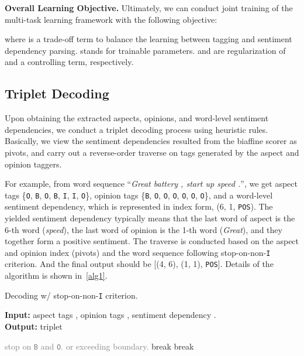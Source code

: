 \documentclass[11pt,a4paper]{article}
\begin{document}
\noindent \textbf{Overall Learning Objective.} Ultimately, we can conduct joint training of the multi-task learning framework with the following objective:

where  is a trade-off term to balance the learning between tagging and sentiment dependency parsing.  stands for trainable parameters.  and  are  regularization of  and a controlling term, respectively.

\subsection{Triplet Decoding}

Upon obtaining the extracted aspects, opinions, and word-level sentiment dependencies, we conduct a triplet decoding process using heuristic rules. Basically, we view the sentiment dependencies resulted from the biaffine scorer as pivots, and carry out a reverse-order traverse on tags generated by the aspect and opinion taggers. 

For example, from word sequence ``\textit{Great battery , start up speed .}'', we get aspect tags \{\texttt{O}, \texttt{B}, \texttt{O}, \texttt{B}, \texttt{I}, \texttt{I}, \texttt{O}\}, opinion tags \{\texttt{B}, \texttt{O}, \texttt{O}, \texttt{O}, \texttt{O}, \texttt{O}, \texttt{O}\}, and a word-level sentiment dependency, which is represented in index form, (6, 1, \texttt{POS}). The yielded sentiment dependency typically means that the last word of aspect is the 6-th word (\textit{speed}), the last word of opinion is the 1-th word (\textit{Great}), and they together form a positive sentiment. The traverse is conducted based on the aspect and opinion index (pivots) and the word sequence following stop-on-non-\texttt{I} criterion. And the final output should be [(4, 6), (1, 1), \texttt{POS}]. Details of the algorithm is shown in~\ref{alg1}.

\begin{algorithm}
    \caption{Decoding w/ stop-on-non-\texttt{I} criterion.}
    \hspace*{0.02in} {\bf Input:}
    aspect tags , opinion tags , sentiment dependency .\\
    \hspace*{0.02in} {\bf Output:}
    triplet 
    \begin{algorithmic}[1]
    \State 
      \textcolor{gray}{stop on \texttt{B} and \texttt{O}.}
    \State 
    \If{}  \textcolor{gray}{or exceeding boundary.}
    \State break
    \EndIf
    \EndWhile
    \State 
    \State 
    \If{}
    \State break
    \EndIf
    \EndWhile
    \State 
    \end{algorithmic}
    \label{alg1} 
\end{algorithm}
\end{document}
